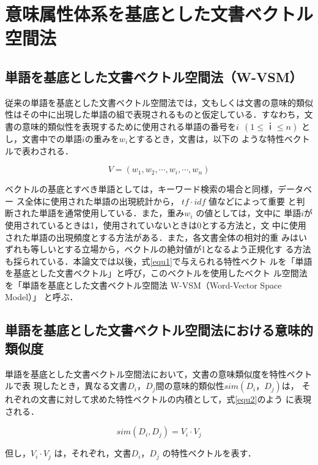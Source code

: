 \section{意味属性体系を基底とした文書ベクトル空間法}
\label{vector}

\subsection{単語を基底とした文書ベクトル空間法（W-VSM）}

従来の単語を基底とした文書ベクトル空間法では，文もしくは文書の意味的類似
性はその中に出現した単語の組で表現されるものと仮定している．すなわち，文
書の意味的類似性を表現するために使用される単語の番号を$ i \ \ (1 \leq ｉ 
\leq n) $ とし，文書中での単語$i$の重みを$w_i$とするとき，文書は，以下の
ような特性ベクトルで表わされる．

\begin{equation}
\label{equ1}
 V = (w_1,w_2, \cdots ,w_i, \cdots ,w_n)  
\end{equation}

ベクトルの基底とすべき単語としては，キーワード検索の場合と同様，データベー
ス全体に使用された単語の出現統計から， $tf \cdot idf$ 値などによって重要
と判断された単語を通常使用している．また，重み$w_i$ の値としては，文中に
単語$i$が使用されているときは1，使用されていないときは0とする方法と，文
中に使用された単語の出現頻度とする方法がある．また，各文書全体の相対的重
みはいずれも等しいとする立場から，ベクトルの絶対値が1となるよう正規化す
る方法も採られている．本論文では以後，式\ref{equ1}で与えられる特性ベクト
ルを「単語を基底とした文書ベクトル」と呼び，このベクトルを使用したベクト
ル空間法を「単語を基底とした文書ベクトル空間法 W-VSM（Word-Vector Space Model）」
と呼ぶ．

\subsection{単語を基底とした文書ベクトル空間法における意味的類似度}

単語を基底とした文書ベクトル空間法において，文書の意味類似度を特性ベクトルで表
現したとき，異なる文書$D_i$，$D_j$間の意味的類似性$ sim (D_i，D_j)$は，
それぞれの文書に対して求めた特性ベクトルの内積として，式\ref{equ2}のよう
に表現される．

\begin{equation}
\label{equ2}
   sim (D_i,D_j)=V_i \cdot V_j 
\end{equation}

但し，$V_i \cdot V_j $ は，それぞれ，文書$ D_i$，$D_j$ の特性ベクトルを表す．

